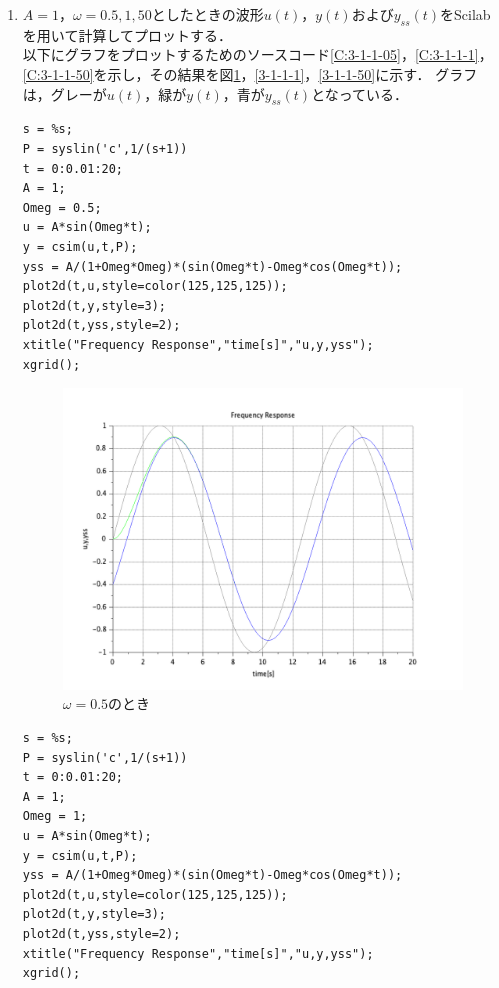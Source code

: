 \documentclass[a4paper,11pt]{jsarticle}
\begin{document}
\begin{enumerate}
    \item $A=1$，$\omega = 0.5, 1, 50$としたときの波形$u(t)$，$y(t)$および$y_{ss}(t)$をScilabを用いて計算してプロットする．\\
      以下にグラフをプロットするためのソースコード\ref{C:3-1-1-05}，\ref{C:3-1-1-1}，\ref{C:3-1-1-50}を示し，その結果を図\ref{3-1-1-05}，\ref{3-1-1-1}，\ref{3-1-1-50}に示す．
      グラフは，グレーが$u(t)$，緑が$y(t)$，青が$y_{ss}(t)$となっている．
      \begin{lstlisting}[caption=図\ref{3-1-1-05}をプロットするコード, label=C:3-1-1-05]
s = %s;
P = syslin('c',1/(s+1))
t = 0:0.01:20;
A = 1;
Omeg = 0.5;
u = A*sin(Omeg*t);
y = csim(u,t,P);
yss = A/(1+Omeg*Omeg)*(sin(Omeg*t)-Omeg*cos(Omeg*t));
plot2d(t,u,style=color(125,125,125));
plot2d(t,y,style=3);
plot2d(t,yss,style=2);
xtitle("Frequency Response","time[s]","u,y,yss");
xgrid();
      \end{lstlisting}
      \begin{figure}[H]
        \centering
        \includegraphics[width=0.8\linewidth]{picture/3-1-1-05.png}
        \caption{$\omega=0.5$のとき}
        \label{3-1-1-05}
      \end{figure}
      \begin{lstlisting}[caption=図\ref{3-1-1-1}をプロットするコード, label=C:3-1-1-1]
s = %s;
P = syslin('c',1/(s+1))
t = 0:0.01:20;
A = 1;
Omeg = 1;
u = A*sin(Omeg*t);
y = csim(u,t,P);
yss = A/(1+Omeg*Omeg)*(sin(Omeg*t)-Omeg*cos(Omeg*t));
plot2d(t,u,style=color(125,125,125));
plot2d(t,y,style=3);
plot2d(t,yss,style=2);
xtitle("Frequency Response","time[s]","u,y,yss");
xgrid();
      \end{lstlisting}
      \begin{figure}[H]
        \centering

\end{figure}
\end{enumerate}
\end{document}
